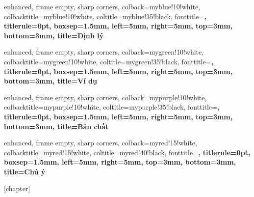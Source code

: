   {
    enhanced, frame empty, sharp corners,
    colback=myblue!10!white, colbacktitle=myblue!10!white,
    coltitle=myblue!35!black, fonttitle=\sffamily\bfseries,
    titlerule=0pt,
    boxsep=1.5mm, left=5mm, right=5mm, top=3mm, bottom=3mm,
    title={\hspace{0.5em}Định lý~\thetcbcounter{}}
  }
  {}

  {
    enhanced, frame empty, sharp corners,
    colback=mygreen!10!white, colbacktitle=mygreen!10!white,
    coltitle=mygreen!35!black, fonttitle=\sffamily\bfseries,
    titlerule=0pt,
    boxsep=1.5mm, left=5mm, right=5mm, top=3mm, bottom=3mm,
    title={\hspace{0.5em}Ví dụ~\thetcbcounter{}}
  }
  {}

  {
    enhanced, frame empty, sharp corners,
    colback=mypurple!10!white, colbacktitle=mypurple!10!white,
    coltitle=mypurple!35!black, fonttitle=\sffamily\bfseries,
    titlerule=0pt,
    boxsep=1.5mm, left=5mm, right=5mm, top=3mm, bottom=3mm,
    title={\hspace{0.5em}Bản chất~\thetcbcounter{}}
  }
  {}

  {
    enhanced, frame empty, sharp corners,
    colback=myred!15!white, colbacktitle=myred!15!white,
    coltitle=myred!40!black, fonttitle=\sffamily\bfseries,
    titlerule=0pt,
    boxsep=1.5mm, left=5mm, right=5mm, top=3mm, bottom=3mm,
    title={\hspace{0.5em}Chú ý~\thetcbcounter{}}
  }
  {}



[chapter]
\renewcommand{\thecauhoicounter}{\thechapter.\arabic{cauhoicounter}}

